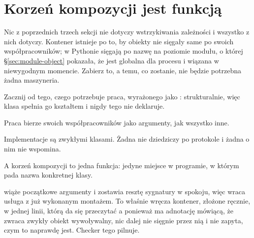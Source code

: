 \section{Korzeń kompozycji jest funkcją}
\label{sec:composition-root}

Nic z poprzednich trzech sekcji nie dotyczy wstrzykiwania zależności i
wszystko z nich dotyczy. Kontener istnieje po to, by obiekty nie sięgały
same po swoich współpracowników; w Pythonie sięgają po nazwę na poziomie
modułu, o której \S\ref{sec:module-object} pokazała, że jest globalna dla
procesu i wiązana w niewygodnym momencie. Zabierz to, a temu, co zostanie,
nie będzie potrzebna żadna maszyneria.

Zacznij od tego, czego potrzebuje praca, wyrażonego jako :
strukturalnie, więc klasa spełnia go kształtem i nigdy tego nie deklaruje.


\noindent
Praca bierze swoich współpracowników jako argumenty, jak wszystko inne.


\noindent
Implementacje są zwykłymi klasami. Żadna nie dziedziczy po protokole i żadna
o nim nie wspomina.


\noindent
A korzeń kompozycji to jedna funkcja: jedyne miejsce w programie, w którym
pada nazwa konkretnej klasy.



\noindent
{} wiąże początkowe argumenty i zostawia resztę
sygnatury w spokoju, więc wraca usługa z już wykonanym montażem. To właśnie
wręcza kontener, złożone ręcznie, w jednej linii, którą da się przeczytać
\dash{} a ponieważ  ma adnotację mówiącą, że zwraca zwykły
obiekt wywoływalny, nic dalej nie sięgnie przez nią i nie zapyta, czym to
naprawdę jest. Checker tego pilnuje.

